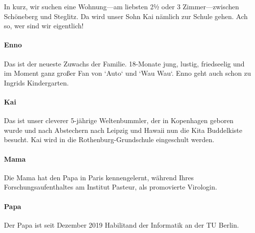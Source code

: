 \documentclass[landscape,a4paper,12pt]{article}
\begin{document}
\begin{minipage}[c]{.45\linewidth}
  \large
  In kurz,  wir suchen eine Wohnung—am liebsten 2½ oder 3 Zimmer—zwischen Schöneberg und Steglitz. Da wird unser Sohn Kai nämlich zur Schule gehen. Ach so, wer sind wir eigentlich! 

\paragraph{\large Enno}
Das ist der neueste Zuwachs der Familie. 18-Monate jung, lustig, friedseelig und im Moment ganz großer Fan von `Auto` und `Wau Wau`. Enno geht auch schon zu Ingrids Kindergarten. 

\paragraph{\large Kai}
Das ist unser cleverer 5-jährige Weltenbummler, der in Kopenhagen geboren wurde und nach Abstechern nach Leipzig und Hawaii nun die Kita Buddelkiste besucht. 
Kai wird in die Rothenburg-Grundschule eingeschult werden. 

\paragraph{\large Mama}
Die Mama hat den Papa in Paris kennengelernt, während Ihres Forschungsaufenthaltes am Institut Pasteur, als promovierte Virologin. 

\paragraph{\large Papa}
Der Papa ist seit Dezember 2019 Habilitand der Informatik an der TU Berlin.

\end{minipage}
\end{document}
